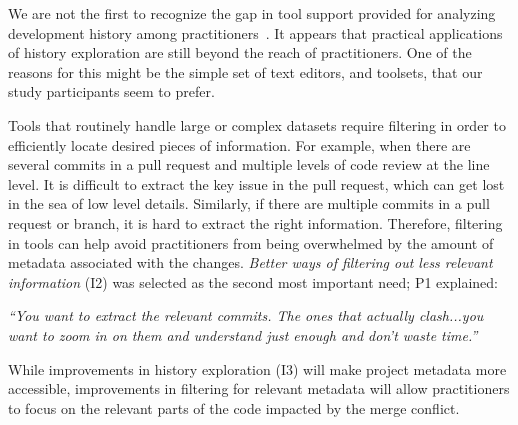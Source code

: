 We are not the first to recognize the gap in tool support provided for analyzing development history among practitioners~\cite{sun2015informationhistory, guo2016cold-start, yan2014miningcontracts}. 
It appears that practical applications of history exploration are still beyond the reach of practitioners. 
One of the reasons for this might be the simple set of text editors, and toolsets, that our study participants seem to prefer.

\label{better_filtering}
Tools that routinely handle large or complex datasets require filtering in order to efficiently locate desired pieces of information.
For example, when there are several commits in a pull request and multiple levels of code review at the line level.
It is difficult to extract the key issue in the pull request, which can get lost in the sea of low level details. Similarly, if there are multiple commits in a pull request or branch, it is hard to extract the right information.
Therefore, filtering in tools can help avoid practitioners from being overwhelmed by the amount of metadata associated with the changes.
\textit{Better ways of filtering out less relevant information} (I2) was selected as the second most important need; P1 explained:
\begin{displayquote}
\textit{``You want to extract the relevant commits. The ones that actually clash...you want to zoom in on them and understand just enough and don't waste time.''}
\end{displayquote}

While improvements in history exploration (I3) will make project metadata more accessible, improvements in filtering for relevant metadata will allow practitioners to focus on the relevant parts of the code impacted by the merge conflict.

